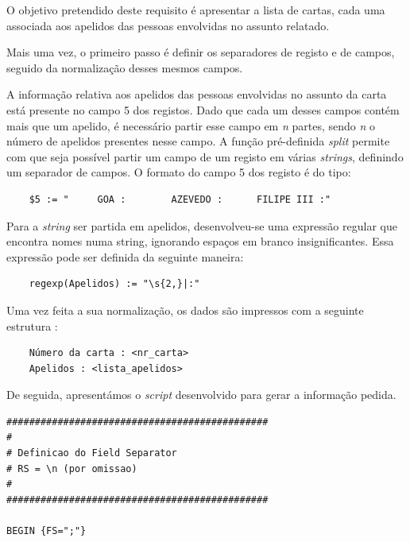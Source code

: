 \documentclass[11pt,a4paper]{report}
\begin{document}
\quad O objetivo pretendido deste requisito é apresentar a lista de cartas, cada uma associada aos apelidos das pessoas envolvidas no assunto relatado. 

\quad Mais uma vez, o primeiro passo é definir os separadores de registo e de campos, seguido da normalização desses mesmos campos.

\quad A informação relativa aos apelidos das pessoas envolvidas no assunto da carta está presente no campo 5 dos registos. Dado que cada um desses campos contém mais que um apelido, é necessário partir esse campo em \textit{n} partes, sendo \textit{n} o número de apelidos presentes nesse campo. A função pré-definida \textit{split} permite com que seja possível partir um campo de um registo em várias \textit{strings}, definindo um separador de campos. O formato do campo 5 dos registo é do tipo:

\begin{verbatim}
    $5 := "     GOA :        AZEVEDO :      FILIPE III :"
\end{verbatim}

Para a \textit{string} ser partida em apelidos, desenvolveu-se uma expressão regular que encontra nomes numa string, ignorando espaços em branco insignificantes. Essa expressão pode ser definida da seguinte maneira:

\begin{verbatim}
    regexp(Apelidos) := "\s{2,}|:"
\end{verbatim}

\quad Uma vez feita a sua normalização, os dados são impressos com a seguinte estrutura :

\begin{verbatim}
    Número da carta : <nr_carta>
    Apelidos : <lista_apelidos>
\end{verbatim}

\quad De seguida, apresentámos o \textit{script} desenvolvido para gerar a informação pedida.

\newpage 
\begin{verbatim}
##############################################
#
# Definicao do Field Separator
# RS = \n (por omissao)
#
##############################################

BEGIN {FS=";"}
\end{verbatim}
\end{document}
